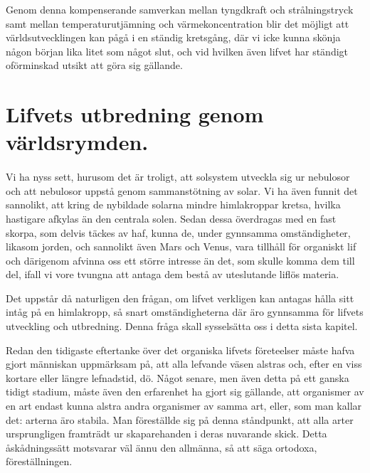 \documentclass[a4paper, 12pt, oneside, swedish]{article}
\begin{document}
Genom denna kompenserande samverkan mellan tyngdkraft och strålningstryck samt mellan temperaturutjämning och värmekoncentration blir det möjligt att världsutvecklingen kan pågå i en ständig kretsgång, där vi icke kunna skönja någon början lika litet som något slut, och vid hvilken även lifvet har ständigt oförminskad utsikt att göra sig gällande.
\clearpage
\section{Lifvets utbredning genom världsrymden.}
\paragraph{}
Vi ha nyss sett, hurusom det är troligt, att solsystem utveckla sig ur nebulosor och att nebulosor uppstå genom sammanstötning av solar. Vi ha även funnit det sannolikt, att kring de nybildade solarna mindre himlakroppar kretsa, hvilka hastigare afkylas än den centrala solen. Sedan dessa överdragas med en fast skorpa, som delvis täckes av haf, kunna de, under gynnsamma omständigheter, likasom jorden, och sannolikt även Mars och Venus, vara tillhåll för organiskt lif och därigenom afvinna oss ett större intresse än det, som skulle komma dem till del, ifall vi vore tvungna att antaga dem bestå av uteslutande liflös materia.

Det uppstår då naturligen den frågan, om lifvet verkligen kan antagas hålla sitt intåg på en himlakropp, så snart omständigheterna där äro gynnsamma för lifvets utveckling och utbredning. Denna fråga skall sysselsätta oss i detta sista kapitel.

Redan den tidigaste eftertanke över det organiska lifvets företeelser måste hafva gjort människan uppmärksam på, att alla lefvande väsen alstras och, efter en viss kortare eller längre lefnadstid, dö. Något senare, men även detta på ett ganska tidigt stadium, måste även den erfarenhet ha gjort sig gällande, att organismer av en art endast kunna alstra andra organismer av samma art, eller, som man kallar det: arterna äro stabila. Man föreställde sig på denna ståndpunkt, att alla arter ursprungligen framträdt ur skaparehanden i deras nuvarande skick. Detta åskådningssätt motsvarar väl ännu den allmänna, så att säga ortodoxa, föreställningen.
\end{document}
